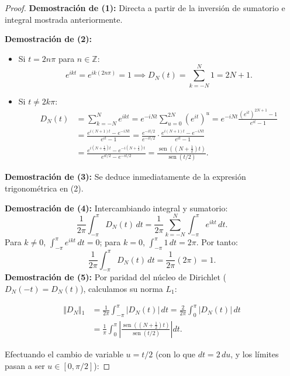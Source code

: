 \begin{proof}
\textbf{Demostración de (1):} Directa a partir de la inversión de sumatorio e integral mostrada anteriormente.

\medskip
\textbf{Demostración de (2):}
\begin{itemize}
    \item Si $t = 2n\pi$ para $n \in \mathbb{Z}$:
    \[
    e^{ikt} = e^{ik(2n\pi)} = 1 \implies D_N(t) = \sum_{k=-N}^N 1 = 2N + 1.
    \]
    \item Si $t \neq 2k\pi$:
    \begin{align*}
    D_N(t) &= \sum_{k=-N}^N e^{ikt} = e^{-iNt} \sum_{u=0}^{2N} (e^{it})^u = e^{-iNt} \frac{(e^{it})^{2N+1} - 1}{e^{it} - 1} \\
    &= \frac{e^{i(N+1)t} - e^{-iNt}}{e^{it} - 1} = \frac{e^{-it/2}}{e^{-it/2}} \cdot \frac{e^{i(N+1)t} - e^{-iNt}}{e^{it} - 1} \\
    &= \frac{e^{i\left(N+\frac{1}{2}\right)t} - e^{-i\left(N+\frac{1}{2}\right)t}}{e^{it/2} - e^{-it/2}} = \frac{\operatorname{sen}\left(\left(N + \frac{1}{2}\right)t\right)}{\operatorname{sen}(t/2)}.
    \end{align*}
\end{itemize}

\medskip
\textbf{Demostración de (3):} Se deduce inmediatamente de la expresión trigonométrica en (2).

\medskip
\textbf{Demostración de (4):}
Intercambiando integral y sumatorio:
\[
\frac{1}{2\pi} \int_{-\pi}^\pi D_N(t) \, dt = \frac{1}{2\pi} \sum_{k=-N}^N \int_{-\pi}^\pi e^{ikt} \, dt.
\]
Para $k \neq 0$, $\int_{-\pi}^\pi e^{ikt} \, dt = 0$; para $k = 0$, $\int_{-\pi}^\pi 1 \, dt = 2\pi$. Por tanto:
\[
\frac{1}{2\pi} \int_{-\pi}^\pi D_N(t) \, dt = \frac{1}{2\pi} (2\pi) = 1.
\]
\textbf{Demostración de (5):}
Por paridad del núcleo de Dirichlet ($D_N(-t) = D_N(t)$), calculamos su norma $L_1$:


$$\begin{aligned}\Vert{}D_N\Vert{}_1 &= \frac{1}{2\pi} \int_{-\pi}^\pi \vert{}D_N(t)\vert{} \, dt = \frac{2}{2\pi} \int_0^\pi \vert{}D_N(t)\vert{} \, dt \\ &= \frac{1}{\pi} \int_0^\pi \left\vert{} \frac{\operatorname{sen}\left(\left(N + \frac{1}{2}\right)t\right)}{\operatorname{sen}(t/2)} \right\vert{} dt.\end{aligned}$$

Efectuando el cambio de variable $u = t/2$ (con lo que $dt = 2\,du$, y los límites pasan a ser $u \in [0, \pi/2]$):



\end{proof}
